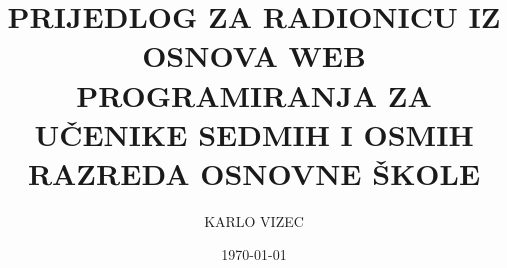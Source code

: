 \documentclass[letterpaper, 11pt]{article}
\newcommand{\1}{\mathds{1}}        %
\theoremstyle{definition}
\begin{document}

    \title{\normalsize\MakeUppercase{\bfseries
    Prijedlog za radionicu iz osnova web programiranja za učenike sedmih i osmih razreda osnovne škole}}
    \author{\small\MakeUppercase{
        Karlo Vizec}}
    \date{\footnotesize\MakeUppercase\today}
    \maketitle
    \vspace{-1cm}


    
    
    
    


    
    

\end{document}
